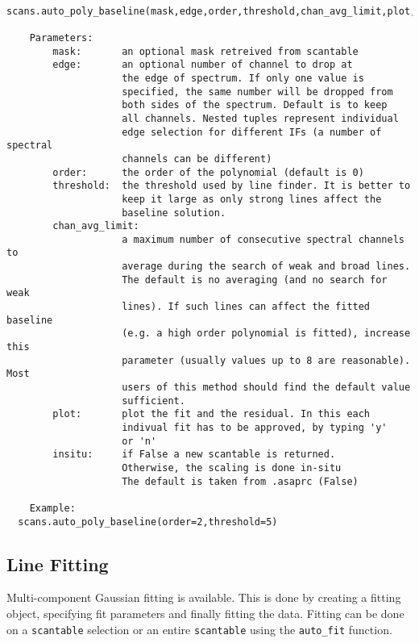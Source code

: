 \small
\begin{verbatim}
  scans.auto_poly_baseline(mask,edge,order,threshold,chan_avg_limit,plot,insitu):

    Parameters:
        mask:       an optional mask retreived from scantable
        edge:       an optional number of channel to drop at
                    the edge of spectrum. If only one value is
                    specified, the same number will be dropped from
                    both sides of the spectrum. Default is to keep
                    all channels. Nested tuples represent individual
                    edge selection for different IFs (a number of spectral
                    channels can be different)
        order:      the order of the polynomial (default is 0)
        threshold:  the threshold used by line finder. It is better to
                    keep it large as only strong lines affect the
                    baseline solution.
        chan_avg_limit:
                    a maximum number of consecutive spectral channels to
                    average during the search of weak and broad lines.
                    The default is no averaging (and no search for weak
                    lines). If such lines can affect the fitted baseline
                    (e.g. a high order polynomial is fitted), increase this
                    parameter (usually values up to 8 are reasonable). Most
                    users of this method should find the default value
                    sufficient.
        plot:       plot the fit and the residual. In this each
                    indivual fit has to be approved, by typing 'y'
                    or 'n'
        insitu:     if False a new scantable is returned.
                    Otherwise, the scaling is done in-situ
                    The default is taken from .asaprc (False)

    Example:
  scans.auto_poly_baseline(order=2,threshold=5)
\end{verbatim}
\normalsize


\subsection{Line Fitting}
\label{subsection:sd.asap.LINEfitting}

Multi-component Gaussian fitting is available. This is done by
creating a fitting object, specifying fit parameters and finally
fitting the data. Fitting can be done on a {\tt scantable} selection
or an entire {\tt scantable} using the {\tt auto\_fit} function.

